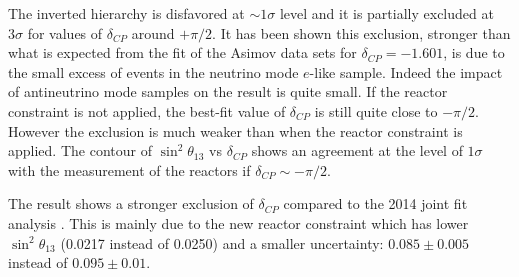 The inverted hierarchy is disfavored at $\sim 1 \sigma$ level and it is partially 
excluded at $3\sigma$ for values of $\delta_{CP}$ around $+\pi/2$.
It has been shown this exclusion, stronger than what is expected from the fit of the Asimov data sets for $\delta_{CP}=-1.601$,
is due to the small excess of events in the neutrino mode $e$-like sample. 
Indeed the impact of antineutrino mode samples on the result is quite small.
If the reactor constraint is not applied, the best-fit value of $\delta_{CP}$ is still quite close to $-\pi/2$.
However the exclusion is much weaker than when the reactor constraint is applied.
The contour of $\sin^2 \theta_{13}$ vs $\delta_{CP}$ shows
an agreement at the level of $1 \sigma$ with the measurement of the reactors if $\delta_{CP} \sim -\pi/2$.

The result shows a stronger exclusion of $\delta_{CP}$ compared to the 2014 joint fit analysis \cite{OurRun1234JointOscillationAnalysis}.
This is mainly due to the new reactor constraint which has lower $\sin^2 \theta_{13}$ (0.0217 instead of 0.0250)
and a smaller uncertainty:
$0.085 \pm 0.005$ instead of
$0.095 \pm 0.01$.



\clearpage



%
%
%
%






\clearpage





